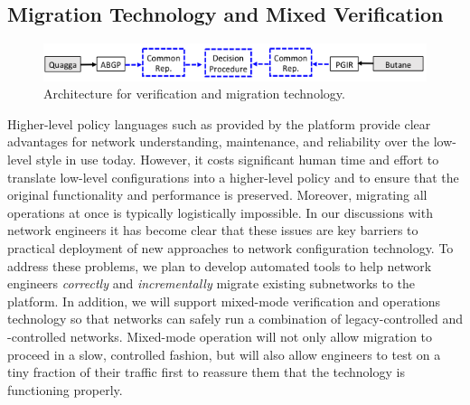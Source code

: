 \subsection{Migration Technology and Mixed Verification}

\begin{figure}[t] 
  \centering
  \includegraphics[width=.9\textwidth]{figures/generic-equivalence}
\caption{Architecture for \Name verification and migration technology.}
\label{fig:transition-tech}
\end{figure}

Higher-level policy languages such as provided by the \Name platform provide clear advantages for network understanding, maintenance, and reliability over the low-level style in use today.  
However, it costs significant human time and effort to translate low-level configurations into a higher-level policy and to ensure that the original functionality and performance is preserved.  Moreover, migrating all operations at once is typically logistically impossible.   In our discussions with network engineers it has become clear that these issues are key barriers to practical deployment of new approaches to network configuration technology.  To address these problems, we plan to develop automated tools to help network engineers
\emph{correctly} and \emph{incrementally} migrate existing subnetworks to the \Name platform.  In addition, we will
support mixed-mode verification and operations technology so that networks can safely
run a combination of legacy-controlled and \Name-controlled networks.  Mixed-mode operation will not only allow
migration to proceed in a slow, controlled fashion, but will also allow engineers to test \Name on a tiny fraction of their
traffic first to reassure them that the technology is functioning properly.






